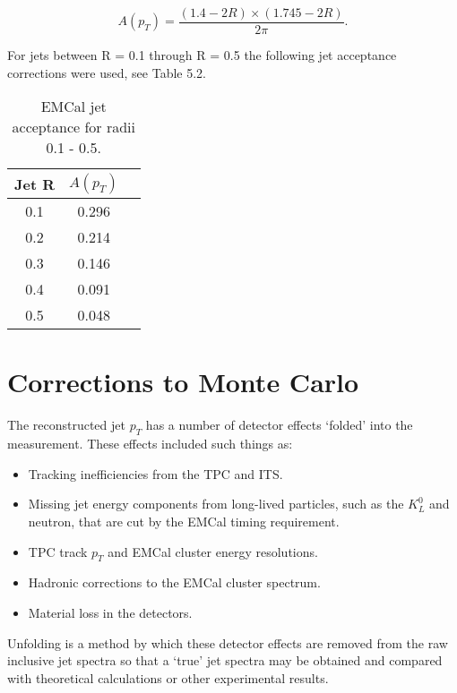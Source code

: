 \begin{equation}
A(p_{T}) = \frac{(1.4 - 2R) \times (1.745 - 2R)}{2 \pi}.
\label{eq:acceptance}
\end{equation}

For jets between R = 0.1 through R = 0.5 the following jet acceptance corrections were used, see Table 5.2.

\begin{table}[hb]
\label{tab:AcceptanceFactor}
\begin{center}
\begin{tabular}[b]{|c|c|c|}
	\hline
	Jet R & $A(p_{T})$ \\ \hline
	0.1 & 0.296 \\ \hline
	0.2 & 0.214\\ \hline
	0.3 & 0.146\\ \hline
	0.4 & 0.091\\ \hline
	0.5 & 0.048\\ \hline
\end{tabular}
\end{center}
\caption{EMCal jet acceptance for radii 0.1 - 0.5.}
\end{table}



\section{Corrections to Monte Carlo}

The reconstructed jet $p_{T}$ has a number of detector effects `folded' into the measurement.  These effects included such things as:

\begin{itemize}
\item Tracking inefficiencies from the TPC and ITS.
\item Missing jet energy components from long-lived particles, such as the $K^{0}_{L}$ and neutron, that are cut by the EMCal timing requirement.
\item TPC track $p_{T}$ and EMCal cluster energy resolutions.
\item Hadronic corrections to the EMCal cluster spectrum.
\item Material loss in the detectors.
\end{itemize}

\noindent
Unfolding is a method by which these detector effects are removed from the raw inclusive jet spectra so that a `true' jet spectra may be obtained and compared with theoretical calculations or other experimental results.  

